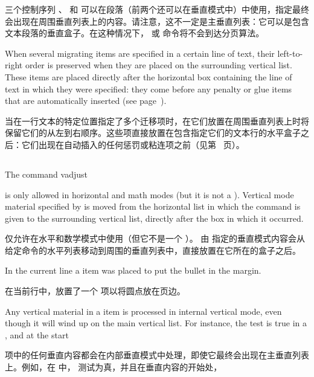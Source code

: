 三个控制序列 、 和  可以在段落（前两个还可以在垂直模式中）中使用，指定最终会出现在周围垂直列表上的内容。请注意，这不一定是主垂直列表：它可以是包含文本段落的垂直盒子。在这种情况下， 或  命令将不会到达分页算法。

When several migrating items are specified in a certain line
of text, their left-to-right order is preserved when they are
placed on the surrounding vertical list. These items are placed
directly after the horizontal box containing the line of text
in which they were specified: they come before any
penalty or glue items that are automatically inserted
(see page~\pageref{between:lines}).

当在一行文本的特定位置指定了多个迁移项时，在它们放置在周围垂直列表上时将保留它们的从左到右顺序。这些项直接放置在包含指定它们的文本行的水平盒子之后：它们出现在自动插入的任何惩罚或粘连项之前（见第~\pageref{between:lines} 页）。

\subsection{}

The command
\cstoidx vadjust\par
\begin{disp}\lb{}\rb\end{disp}
\awp
is only allowed in horizontal and math modes (but it is
not a ).
Vertical mode material specified by  is moved from
the horizontal list in which the command is given
to the surrounding vertical list, directly after the box
in which it occurred.

仅允许在水平和数学模式中使用（但它不是一个 ）。
由  指定的垂直模式内容会从给定命令的水平列表移动到周围的垂直列表中，直接放置在它所在的盒子之后。

In the current line
a  item was placed to put the bullet in the margin.

在当前行中，放置了一个  项以将圆点放在页边。

Any vertical material in a  item is processed
in internal vertical mode, even though it will wind up
on the main vertical list. For instance, the 
test is true in a , and at the start

 项中的任何垂直内容都会在内部垂直模式中处理，即使它最终会出现在主垂直列表上。例如，在  中， 测试为真，并且在垂直内容的开始处，

